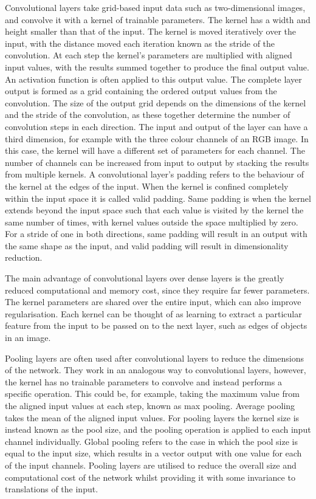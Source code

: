 \documentclass[12pt]{article}
\begin{document}
Convolutional layers take grid-based input data such as two-dimensional images, and convolve it with a kernel of trainable parameters. The kernel has a width and height smaller than that of the input. The kernel is moved iteratively over the input, with the distance moved each iteration known as the stride of the convolution. At each step the kernel's parameters are multiplied with aligned input values, with the results summed together to produce the final output value. An activation function is often applied to this output value. The complete layer output is formed as a grid containing the ordered output values from the convolution. The size of the output grid depends on the dimensions of the kernel and the stride of the convolution, as these together determine the number of convolution steps in each direction. The input and output of the layer can have a third dimension, for example with the three colour channels of an RGB image. In this case, the kernel will have a different set of parameters for each channel. The number of channels can be increased from input to output by stacking the results from multiple kernels. A convolutional layer's padding refers to the behaviour of the kernel at the edges of the input. When the kernel is confined completely within the input space it is called valid padding. Same padding is when the kernel extends beyond the input space such that each value is visited by the kernel the same number of times, with kernel values outside the space multiplied by zero. For a stride of one in both directions, same padding will result in an output with the same shape as the input, and valid padding will result in dimensionality reduction.

The main advantage of convolutional layers over dense layers is the greatly reduced computational and memory cost, since they require far fewer parameters. The kernel parameters are shared over the entire input, which can also improve regularisation. Each kernel can be thought of as learning to extract a particular feature from the input to be passed on to the next layer, such as edges of objects in an image.

Pooling layers are often used after convolutional layers to reduce the dimensions of the network. They work in an analogous way to convolutional layers, however, the kernel has no trainable parameters to convolve and instead performs a specific operation. This could be, for example, taking the maximum value from the aligned input values at each step, known as max pooling. Average pooling takes the mean of the aligned input values. For pooling layers the kernel size is instead known as the pool size, and the pooling operation is applied to each input channel individually. Global pooling refers to the case in which the pool size is equal to the input size, which results in a vector output with one value for each of the input channels. Pooling layers are utilised to reduce the overall size and computational cost of the network whilst providing it with some invariance to translations of the input.
\end{document}
